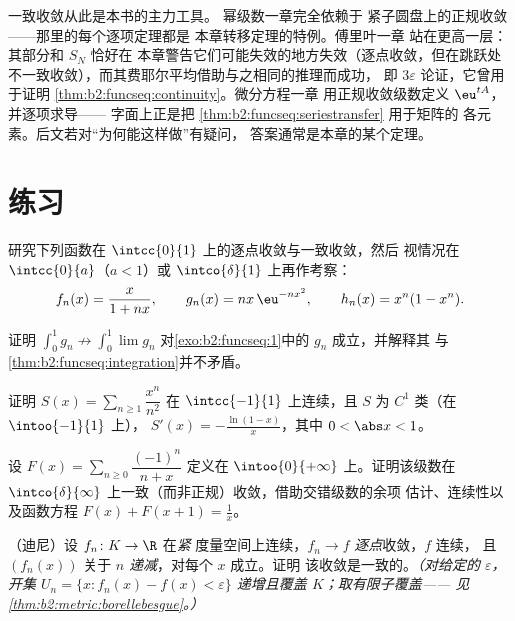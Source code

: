 \begin{remark}[本册中的展望]
一致收敛从此是本书的主力工具。
幂级数一章完全依赖于
紧子圆盘上的正规收敛——那里的每个逐项定理都是
本章转移定理的特例。傅里叶一章
站在更高一层：其部分和 $S_N$ 恰好在
本章警告它们可能失效的地方失效（逐点收敛，但在跳跃处
不一致收敛），而其费耶尔平均借助与之相同的推理而成功，
即 $3\varepsilon$ 论证，它曾用于证明
\cref{thm:b2:funcseq:continuity}。微分方程一章
用正规收敛级数定义 $\eu^{tA}$，并逐项求导——
字面上正是把
\cref{thm:b2:funcseq:seriestransfer} 用于矩阵的
各元素。后文若对“为何能这样做”有疑问，
答案通常是本章的某个定理。
\end{remark}

\section{练习}

\begin{exercise}[$\star$]\label{exo:b2:funcseq:1}
研究下列函数在 $\intcc{0}{1}$ 上的逐点收敛与一致收敛，然后
视情况在 $\intcc{0}{a}$（$a < 1$）或 $\intco{\delta}{1}$ 上再作考察：
\[
f_n(x) = \frac{x}{1 + nx},
\qquad
g_n(x) = n x\,\eu^{-n x^2},
\qquad
h_n(x) = x^n(1 - x^n).
\]
\end{exercise}

\begin{exercise}[$\star$]\label{exo:b2:funcseq:2}
证明 $\displaystyle\int_0^1 g_n \not\to \int_0^1 \lim g_n$
对\cref{exo:b2:funcseq:1}中的 $g_n$ 成立，并解释其
与\cref{thm:b2:funcseq:integration}并不矛盾。
\end{exercise}

\begin{exercise}[$\star$]\label{exo:b2:funcseq:3}
证明 $S(x) = \sum_{n\geq1} \dfrac{x^n}{n^2}$ 在
$\intcc{-1}{1}$ 上连续，且 $S$ 为 $C^1$ 类（在 $\intoo{-1}{1}$ 上），
$S'(x) = -\frac{\ln(1-x)}{x}$，其中 $0 < \abs x < 1$。
\end{exercise}

\begin{exercise}[$\star\star$]\label{exo:b2:funcseq:4}
设 $F(x) = \sum_{n \geq 0} \dfrac{(-1)^n}{n + x}$ 定义在
$\intoo{0}{+\infty}$ 上。证明该级数在
$\intco{\delta}{\infty}$ 上一致（而非正规）收敛，借助交错级数的余项
估计、连续性以及函数方程 $F(x) + F(x + 1) =
\frac1x$。
\end{exercise}

\begin{exercise}[$\star\star$]\label{exo:b2:funcseq:5}
（迪尼）设 $f_n \colon K \to \R$ 在\emph{紧}
度量空间上连续，$f_n \to f$ \emph{逐点}收敛，$f$ 连续，
且 $(f_n(x))$ 关于 $n$ \emph{递减}，对每个 $x$ 成立。证明
该收敛是一致的。\emph{（对给定的 $\varepsilon$，开集
$U_n = \{x : f_n(x) - f(x) < \varepsilon\}$ 递增且覆盖
$K$；取有限子覆盖——
见\cref{thm:b2:metric:borellebesgue}。）}
\end{exercise}

